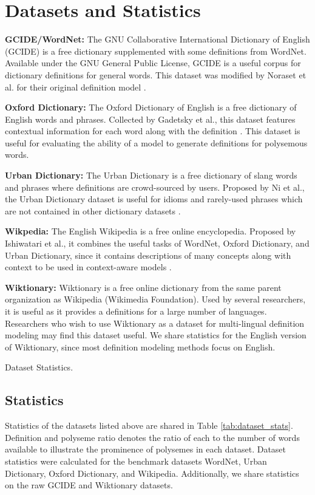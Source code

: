 \section{Datasets and Statistics}

\textbf{GCIDE/WordNet:} The GNU Collaborative International Dictionary of
English (GCIDE) is a free dictionary supplemented with some definitions from
WordNet. Available under the GNU General Public License, GCIDE is a useful
corpus for dictionary definitions for general words. This dataset was modified
by Noraset et al. for their original definition model
\cite{noraset_definition_2016}.

\textbf{Oxford Dictionary:} The Oxford Dictionary of English is a free
dictionary of English words and phrases. Collected by
Gadetsky et al., this dataset features contextual
information for each word along with the definition
\cite{gadetsky_conditional_2018}. This dataset is useful for evaluating the
ability of a model to generate definitions for polysemous words.

\textbf{Urban Dictionary:} The Urban Dictionary is a free dictionary of slang
words and phrases where definitions are crowd-sourced by users. Proposed by
Ni et al., the Urban Dictionary dataset is useful for
idioms and rarely-used phrases which are not contained in other dictionary
datasets \cite{ni_learning_2017}.

\textbf{Wikpedia:} The English Wikipedia is a free online encyclopedia. Proposed
by Ishiwatari et al., it combines the useful tasks of
WordNet, Oxford Dictionary, and Urban Dictionary, since it contains descriptions
of many concepts along with context to be used in context-aware models
\cite{ishiwatari_learning_2019}.

\textbf{Wiktionary:} Wiktionary is a free online dictionary from the same 
parent organization as Wikipedia (Wikimedia Foundation). Used by
several researchers, it is useful as it provides a definitions for a large
number of languages. Researchers who wish to use Wiktionary as a dataset for
multi-lingual definition modeling may find this dataset useful. We share statistics
for the English version of Wiktionary, since most definition modeling methods
focus on English.

\begin{table}
    \centering
    \caption{Dataset Statistics.}
    
    \label{tab:dataset_stats}
\end{table}

\subsection{Statistics}
Statistics of the datasets listed above are shared in Table
\ref{tab:dataset_stats}. Definition and polyseme ratio denotes the ratio of
each to the number of words available to illustrate the prominence of polysemes
in each dataset. Dataset statistics were calculated for the benchmark datasets
WordNet, Urban Dictionary, Oxford Dictionary, and Wikipedia. Additionally, we
share statistics on the raw GCIDE and Wiktionary datasets.
